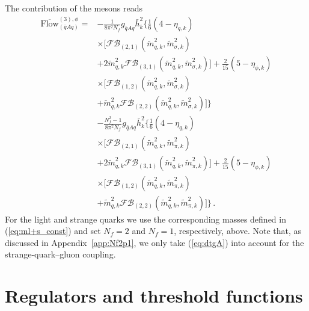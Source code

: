 \documentclass[%
reprint,
superscriptaddress,
showpacs,preprintnumbers,
 amsmath,amssymb,
 aps,
prd,
]{revtex4-1}
\def\eq#1{(\ref{#1})}
\def\app#1{Appendix~\ref{#1}}
\begin{document}
%
The contribution of the mesons reads
%
\begin{align}
  \overline{\textrm{Flow}}^{(3),\phi}_{{(\bar q A q)}}
  =&-\frac{1}{8\pi^2N_f}g_{\bar{q}Aq}
     \bar{h}_{k}^{2}\bigg\{\frac{1}{6}(4-\eta_{q,k})\nonumber
  \\[1ex] 
   &\times\Big[\mathcal{FB}_{(2,1)}(\tilde{m}_{q,k}^{2},
     \tilde{m}_{\sigma,k}^{2})\nonumber \\[1ex] 
   &+2\tilde{m}_{q,k}^{2}\mathcal{FB}_{(3,1)}(\tilde{m}_{q,k}^{2},
     \tilde{m}_{\sigma,k}^{2})\Big]+\frac{2}{15}(5-\eta_{\phi,k})
     \nonumber \\[1ex] 
   &\times\Big[\mathcal{FB}_{(1,2)}(\tilde{m}_{q,k}^{2},\tilde{m}_{\sigma,k}^{2})
     \nonumber \\[1ex] 
   &+\tilde{m}_{q,k}^{2}\mathcal{FB}_{(2,2)}(\tilde{m}_{q,k}^{2},
     \tilde{m}_{\sigma,k}^{2})\Big]\bigg\}\nonumber \\[1ex] 
   &-\frac{N_f^2-1}{8\pi^2N_f}g_{\bar{q}Aq}\bar{h}_{k}^{2}
     \bigg\{\frac{1}{6}(4-\eta_{q,k})\nonumber \\[1ex] 
   &\times\Big[\mathcal{FB}_{(2,1)}(\tilde{m}_{q,k}^{2},
     \tilde{m}_{\pi,k}^{2})\nonumber \\[1ex] 
   &+2\tilde{m}_{q,k}^{2}\mathcal{FB}_{(3,1)}(\tilde{m}_{q,k}^{2},
     \tilde{m}_{\pi,k}^{2})\Big]+\frac{2}{15}(5-\eta_{\phi,k})
     \nonumber \\[1ex] 
   &\times\Big[\mathcal{FB}_{(1,2)}(\tilde{m}_{q,k}^{2},
     \tilde{m}_{\pi,k}^{2})\nonumber \\[1ex] 
   &+\tilde{m}_{q,k}^{2}\mathcal{FB}_{(2,2)}(\tilde{m}_{q,k}^{2},
     \tilde{m}_{\pi,k}^{2})\Big]\bigg\}\,.
 \label{eq:dtgphi}
\end{align}
%
For the light and strange quarks we use the corresponding masses
defined in \eq{eq:ml+s_const} and set $N_f = 2$ and $N_f = 1$,
respectively, above. Note that, as discussed in \app{app:Nf2p1}, we
only take \eq{eq:dtgA} into account for the strange-quark--gluon
coupling.








\section{Regulators and threshold functions}
\label{app:threshold}
\end{document}
